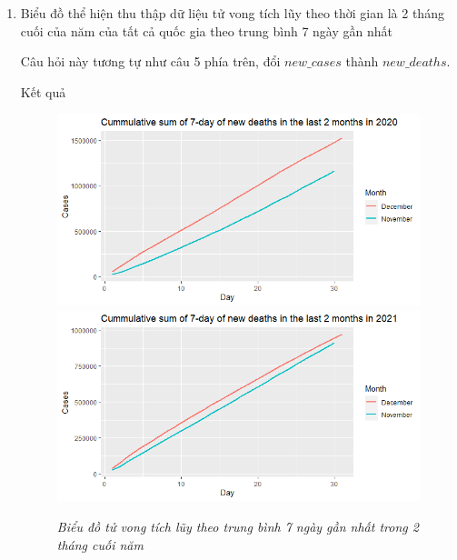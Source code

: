 \documentclass[a4paper]{article}
\theoremstyle{definition}
\begin{document}
\begin{enumerate}[1)]
    \item Biểu đồ thể hiện thu thập dữ liệu tử vong tích lũy theo thời gian là 2 tháng cuối của năm của tất cả quốc gia theo trung bình 7 ngày gần nhất
    
    Câu hỏi này tương tự như câu 5 phía trên, đổi $new\_cases$ thành $new\_deaths$.
    
    Kết quả
    
    \begin{figure}[H]
    \begin{center}
        \includegraphics[scale = .5]{viii/cum 2020deaths.png}
        \includegraphics[scale = .5]{viii/cum 2021deaths.png}
    \end{center}
        \vspace{+3mm}\caption{\it Biểu đồ tử vong tích lũy theo trung bình 7 ngày gần nhất trong 2 tháng cuối năm}
    \end{figure}
\end{enumerate}
\end{document}
